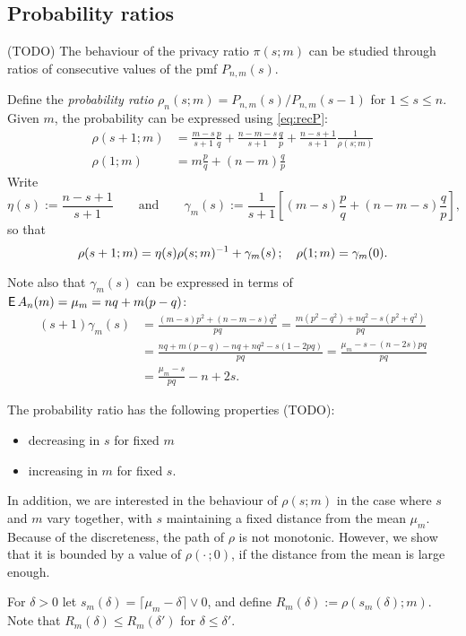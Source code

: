 \documentclass[11pt,draft]{article}
\begin{document}
\subsection{Probability ratios}

(TODO) The behaviour of the privacy ratio $\pi(s;m)$ can be studied through ratios of consecutive values of the pmf $P_{n,m}(s)$.

Define the \emph{probability ratio} $\rho_n(s;m) = P_{n,m}(s) / P_{n,m}(s-1)$ for $1\leq s \leq n$. Given $m$, the probability can be expressed using \eqref{eq:recP}:
\begin{align*}
\rho(s+1;m) &= \frac{m-s}{s+1}\frac{p}{q} + \frac{n-m-s}{s+1}\frac{q}{p} + \frac{n-s+1}{s+1} \frac{1}{\rho(s;m)} \\
\rho(1;m) &= m\frac{p}{q} + (n-m)\frac{q}{p}
\end{align*}
Write
\[ \eta(s) := \frac{n-s+1}{s+1} \qquad\text{and}\qquad
\gamma_m(s) := \frac{1}{s+1} \left[(m-s)\frac{p}{q} + (n-m-s)\frac{q}{p}\right], \]
so that
\[ \rho(s+1;m) = \eta(s)\rho(s;m)^{-1} + \gamma_m(s)\,; \quad
\rho(1;m) = \gamma_m(0). \]

Note also that $\gamma_m(s)$ can be expressed in terms of $\operatorname{\mathsf{E}} A_n(m) = \mu_m = nq + m(p-q)$:
\begin{align*}
(s+1)\gamma_m(s) &= \frac{(m-s)p^2 + (n-m-s)q^2}{pq}
 = \frac{m(p^2-q^2) + nq^2 - s(p^2 + q^2)}{pq} \\
 &= \frac{nq + m(p-q) - nq + nq^2 - s(1-2pq)}{pq}
 = \frac{\mu_m - s -(n - 2s)pq}{pq} \\
 &= \frac{\mu_m - s}{pq} - n + 2s.
\end{align*} 

The probability ratio has the following properties (TODO):
\begin{itemize}
\item decreasing in $s$ for fixed $m$
\item increasing in $m$ for fixed $s$.
\end{itemize}

In addition, we are interested in the behaviour of $\rho(s;m)$ in the case where
$s$ and $m$ vary together, with $s$ maintaining a fixed distance from the mean
$\mu_m$.
Because of the discreteness, the path of $\rho$ is not monotonic.
However, we show that it is bounded by a value of $\rho(\cdot\,;0)$, if the
distance from the mean is large enough.

For $\delta > 0$ let $s_m(\delta) = \lceil \mu_m - \delta \rceil \vee 0$, and define $R_m(\delta) := \rho(s_m(\delta); m)$.
Note that $R_m(\delta) \leq R_m(\delta')$ for $\delta \leq \delta'$.
\end{document}
